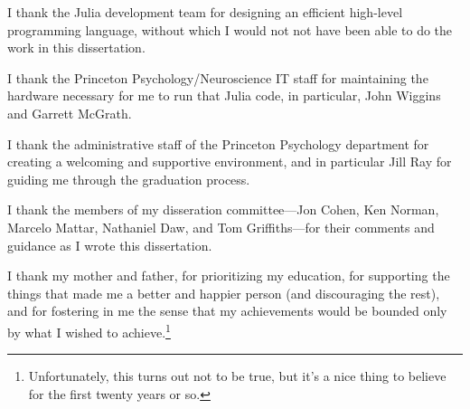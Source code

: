 I thank the Julia development team for designing an efficient high-level programming language, without which I would not not have been able to do the work in this dissertation.

I thank the Princeton Psychology/Neuroscience IT staff for maintaining the hardware necessary for me to run that Julia code, in particular, John Wiggins and Garrett McGrath.

I thank the administrative staff of the Princeton Psychology department for creating a welcoming and supportive environment, and in particular Jill Ray for guiding me through the graduation process.

I thank the members of my disseration committee---Jon Cohen, Ken Norman, Marcelo Mattar, Nathaniel Daw, and Tom Griffiths---for their comments and guidance as I wrote this dissertation.

I thank my mother and father, for prioritizing my education, for supporting the things that made me a better and happier person (and discouraging the rest),  and for fostering in me the sense that my achievements would be bounded only by what I wished to achieve.\footnote{%
  Unfortunately, this turns out not to be true, but it's a nice thing to believe for the first twenty years or so.
}












